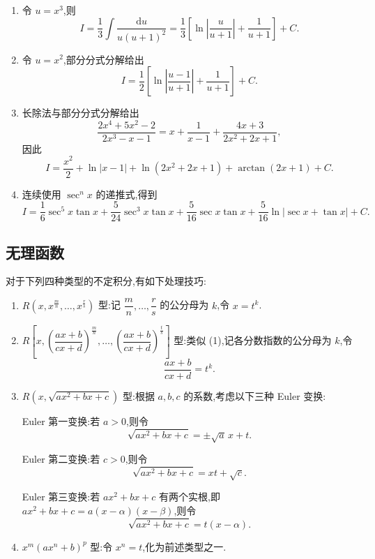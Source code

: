 \begin{solution}
    \leavevmode
    \begin{enumerate}
        \item 令 $u=x^3$,则
              \[
                  I=\dfrac{1}{3}\int\dfrac{\mathrm{d}u}{u(u+1)^2}
                  =\dfrac{1}{3}\left[\ln\left|\dfrac{u}{u+1}\right|+\dfrac{1}{u+1}\right]+C.
              \]
        \item 令 $u=x^2$,部分分式分解给出
              \[
                  I=\dfrac{1}{2}\left[\ln\left|\dfrac{u-1}{u+1}\right|+\dfrac{1}{u+1}\right]+C.
              \]
        \item 长除法与部分分式分解给出
              \[
                  \dfrac{2x^4+5x^2-2}{2x^3-x-1}
                  =x+\dfrac{1}{x-1}+\dfrac{4x+3}{2x^2+2x+1},
              \]
              因此
              \[
                  I=\dfrac{x^2}{2}+\ln|x-1|+\ln(2x^2+2x+1)
                  +\arctan(2x+1)+C.
              \]
        \item 连续使用 $\sec^n x$ 的递推式,得到
              \[
                  I=\dfrac{1}{6}\sec^5x\tan x+\dfrac{5}{24}\sec^3x\tan x
                  +\dfrac{5}{16}\sec x\tan x
                  +\dfrac{5}{16}\ln|\sec x+\tan x|+C.
              \]
    \end{enumerate}
\end{solution}



\subsection{无理函数}

\begin{proposition}[\markstar]
    对于下列四种类型的不定积分,有如下处理技巧:
    \begin{enumerate}
        \item $R\left(x,x^{\frac{m}{n}},\ldots,x^{\frac{r}{s}}\right)$ 型:记 $\dfrac{m}{n},\ldots,\dfrac{r}{s}$ 的公分母为 $k$,令 $x=t^k$.
        \item $R\left[x,\left(\dfrac{ax+b}{cx+d}\right)^{\frac{m}{n}},\ldots,
                      \left(\dfrac{ax+b}{cx+d}\right)^{\frac{t}{s}}\right]$ 型:类似 (1),记各分数指数的公分母为 $k$,令
              \[
                  \dfrac{ax+b}{cx+d}=t^k.
              \]
        \item $R(x,\sqrt{ax^2+bx+c})$ 型:根据 $a,b,c$ 的系数,考虑以下三种 Euler 变换:

              Euler 第一变换:若 $a>0$,则令
              \[
                  \sqrt{ax^2+bx+c}=\pm\sqrt{a}\,x+t.
              \]

              Euler 第二变换:若 $c>0$,则令
              \[
                  \sqrt{ax^2+bx+c}=xt+\sqrt{c}.
              \]

              Euler 第三变换:若 $ax^2+bx+c$ 有两个实根,即 $ax^2+bx+c=a(x-\alpha)(x-\beta)$,则令
              \[
                  \sqrt{ax^2+bx+c}=t(x-\alpha).
              \]
        \item $x^m(ax^n+b)^p$ 型:令 $x^n=t$,化为前述类型之一.
    \end{enumerate}
\end{proposition}


